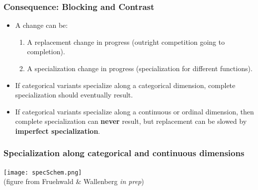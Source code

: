 \documentclass[hyperref={pdfpagelabels=false}]{beamer}
\begin{document}



\begin{frame}
\frametitle{Consequence: Blocking and Contrast}
\begin{itemize}
	\item A change can be:
		\begin{enumerate}
			\item A replacement change in progress (outright competition going to completion).
			\item A specialization change in progress (specialization for different functions).
		\end{enumerate}
	\item If categorical variants specialize along a categorical dimension, complete specialization should eventually result.
	\item If categorical variants specialize along a continuous or ordinal dimension, then complete specialization can \textbf{never} result, but replacement can be slowed by \textbf{imperfect specialization}.
\end{itemize}

\end{frame}


\begin{frame}
\frametitle{Specialization along categorical and continuous dimensions}

\begin{center}
\texttt{[image: specSchem.png]}\\
(figure from Fruehwald \& Wallenberg \textsl{in prep})\nocite{fruehwaldwallenberginprep}
\end{center}

\end{frame}
\end{document}
